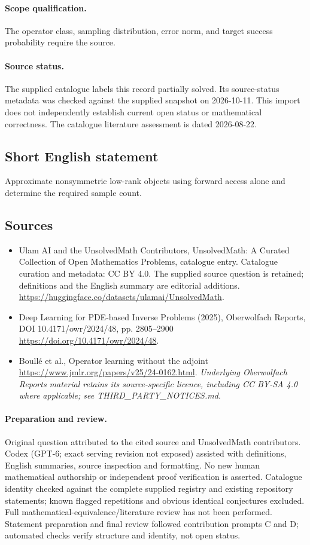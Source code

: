 \documentclass[11pt]{article}
\begin{document}
\paragraph{Scope qualification.}
The operator class, sampling distribution, error norm, and target success probability require the source.
\paragraph{Source status.}
The supplied catalogue labels this record partially solved. Its source-status metadata was checked against the supplied snapshot on 2026-10-11. This import does not independently establish current open status or mathematical correctness. The catalogue literature assessment is dated 2026-08-22.
\subsection{Short English statement}
Approximate nonsymmetric low-rank objects using forward access alone and determine the required sample count.
\subsection{Sources}
\begin{itemize}
\item[S1] Ulam AI and the UnsolvedMath Contributors, UnsolvedMath: A Curated Collection of Open Mathematics Problems, catalogue entry. Catalogue curation and metadata: CC BY 4.0. The supplied source question is retained; definitions and the English summary are editorial additions.
\url{https://huggingface.co/datasets/ulamai/UnsolvedMath}.
\item[S2] Deep Learning for PDE-based Inverse Problems (2025), Oberwolfach Reports, DOI 10.4171/owr/2024/48, pp. 2805--2900
\url{https://doi.org/10.4171/owr/2024/48}.
\item[S3] Boullé et al., Operator learning without the adjoint
\url{https://www.jmlr.org/papers/v25/24-0162.html}.
\textit{Underlying Oberwolfach Reports material retains its source-specific licence, including CC BY-SA 4.0 where applicable; see THIRD\_PARTY\_NOTICES.md.}
\end{itemize}
\paragraph{Preparation and review.}
Original question attributed to the cited source and UnsolvedMath contributors. Codex (GPT-6; exact serving revision not exposed) assisted with definitions, English summaries, source inspection and formatting. No new human mathematical authorship or independent proof verification is asserted. Catalogue identity checked against the complete supplied registry and existing repository statements; known flagged repetitions and obvious identical conjectures excluded. Full mathematical-equivalence/literature review has not been performed. Statement preparation and final review followed contribution prompts C and D; automated checks verify structure and identity, not open status.
\label{end:statement}
\end{document}
